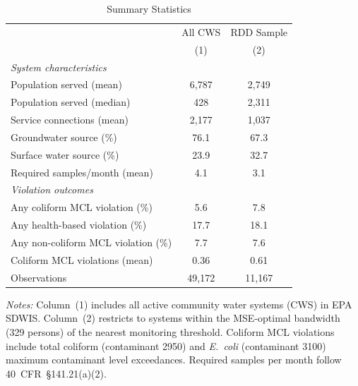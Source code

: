 \begin{table}[H]
\centering
\caption{Summary Statistics}
\begin{threeparttable}
\begin{tabular}{lcc}
\toprule
 & All CWS & RDD Sample \\
 & (1) & (2) \\
\midrule
\textit{System characteristics} & & \\
Population served (mean) & 6,787 & 2,749 \\
Population served (median) & 428 & 2,311 \\
Service connections (mean) & 2,177 & 1,037 \\
Groundwater source (\%) & 76.1 & 67.3 \\
Surface water source (\%) & 23.9 & 32.7 \\
Required samples/month (mean) & 4.1 & 3.1 \\
\midrule
\textit{Violation outcomes} & & \\
Any coliform MCL violation (\%) & 5.6 & 7.8 \\
Any health-based violation (\%) & 17.7 & 18.1 \\
Any non-coliform MCL violation (\%) & 7.7 & 7.6 \\
Coliform MCL violations (mean) & 0.36 & 0.61 \\
\midrule
Observations & 49,172 & 11,167 \\
\bottomrule
\end{tabular}
\begin{tablenotes}[flushleft]
\small
\item \textit{Notes:} Column~(1) includes all active community water systems (CWS) in EPA SDWIS. Column~(2) restricts to systems within the MSE-optimal bandwidth (329 persons) of the nearest monitoring threshold. Coliform MCL violations include total coliform (contaminant 2950) and \textit{E.~coli} (contaminant 3100) maximum contaminant level exceedances. Required samples per month follow 40~CFR~\S141.21(a)(2).
\end{tablenotes}
\end{threeparttable}
\label{tab:summary}
\end{table}
